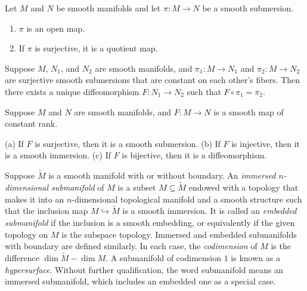 \begin{proposition}
\label{prop:properties-of-submersions}
Let $M$ and $N$ be smooth manifolds and let $\pi: M \to N$ be a smooth submersion.
\begin{enumerate}[label=(\alph*)]
\item $\pi$ is an open map.
\item If $\pi$ is surjective, it is a quotient map.
\end{enumerate}
\end{proposition}

\begin{proposition}
\label{prop:uniqueness-smooth-quotients}

Suppose $M$, $N_1$, and $N_2$ are smooth manifolds, and $\pi_1 : M \to N_1$ and $\pi_2 : M \to N_2$ are surjective smooth submersions that are constant on each other's fibers. Then there exists a unique diffeomorphism $F : N_1 \to N_2$ such that $F \circ \pi_1 = \pi_2$.
\end{proposition}

\begin{theorem}
\label{thm:global-rank-theorem}

Suppose $M$ and $N$ are smooth manifolds, and $F : M \to N$ is a smooth map of constant rank.

(a) If $F$ is surjective, then it is a smooth submersion.
(b) If $F$ is injective, then it is a smooth immersion.
(c) If $F$ is bijective, then it is a diffeomorphism.
\end{theorem}

Suppose $\tilde{M}$ is a smooth manifold with or without boundary. An \emph{immersed $n$-dimensional submanifold} of $M$ is a subset $M \subseteq \tilde{M}$ endowed with a topology that makes it into an $n$-dimensional topological manifold and a smooth structure such that the inclusion map $M \hookrightarrow \tilde{M}$ is a smooth immersion. It is called an \emph{embedded submanifold} if the inclusion is a smooth embedding, or equivalently if the given topology on $M$ is the subspace topology. Immersed and embedded submanifolds with boundary are defined similarly. In each case, the \emph{codimension} of $M$ is the difference $\dim \tilde{M} - \dim M$. A submanifold of codimension $1$ is known as a \emph{hypersurface}. Without further qualification, the word submanifold means an immersed submanifold, which includes an embedded one as a special case.

